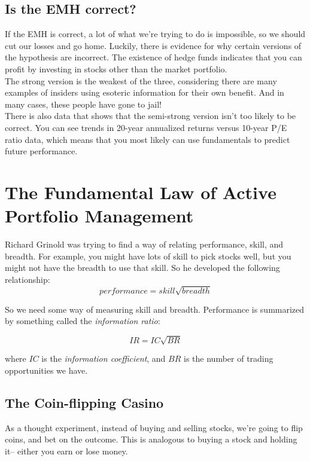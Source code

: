 \subsection{Is the EMH correct?}
\noindent If the EMH is correct, a lot of what we're trying to do is impossible, so we should cut our losses and go home. Luckily, there is evidence for why certain versions of the hypothesis are incorrect. The existence of hedge funds indicates that you can profit by investing in stocks other than the market portfolio.\\

\noindent The strong version is the weakest of the three, considering there are many examples of insiders using esoteric information for their own benefit. And in many cases, these people have gone to jail!\\

\noindent There is also data that shows that the semi-strong version isn't too likely to be correct. You can see trends in 20-year annualized returns versus 10-year P/E ratio data, which means that you most likely can use fundamentals to predict future performance.\\

\section{The Fundamental Law of Active Portfolio Management}
\noindent Richard Grinold was trying to find a way of relating performance, skill, and breadth. For example, you might have lots of skill to pick stocks well, but you might not have the breadth to use that skill. So he developed the following relationship:
\begin{equation*}
{performance} = {skill}\sqrt{breadth}
\end{equation*}

\noindent So we need some way of measuring skill and breadth. Performance is summarized by something called the \textit{information ratio}:

\begin{equation} \label{eq:inforatio}
{IR} = {IC}\sqrt{BR}
\end{equation}

\noindent where $IC$ is the \textit{information coefficient}, and $BR$ is the number of trading opportunities we have.

\subsection{The Coin-flipping Casino}
\noindent As a thought experiment, instead of buying and selling stocks, we're going to flip coins, and bet on the outcome. This is analogous to buying a stock and holding it-- either you earn or lose money.\\

